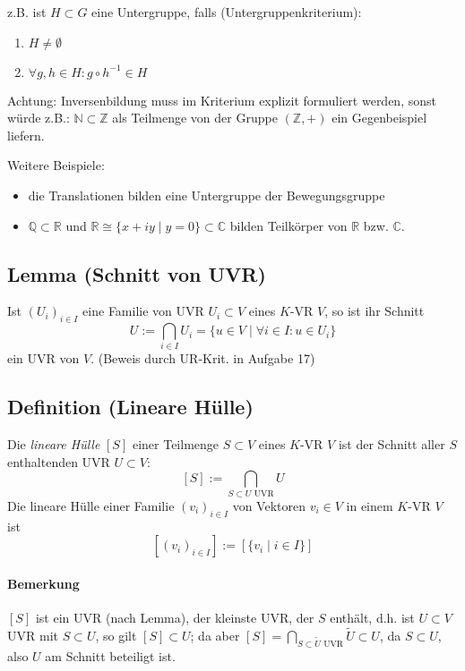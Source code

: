  		z.B. ist $H\subset G$ eine Untergruppe, falls (Untergruppenkriterium):
 		\begin{enumerate}
 			\item $H\neq \emptyset$
 			\item $\forall g,h\in H: g\circ h^{-1} \in H$
 		\end{enumerate}

 		Achtung: Inversenbildung muss im Kriterium explizit formuliert werden, sonst würde z.B.: $\mathbb{N}\subset\mathbb{Z}$ als Teilmenge von der Gruppe $(\mathbb{Z}, +)$ ein Gegenbeispiel liefern.

 		Weitere Beispiele:
 		\begin{itemize}
 			\item die Translationen bilden eine Untergruppe der Bewegungsgruppe
 			\item $\mathbb{Q}\subset\mathbb{R}$ und $\mathbb{R}\cong \{x+iy\mid y=0\}\subset\mathbb{C}$ bilden Teilkörper von $\mathbb{R}$ bzw. $\mathbb{C}$.
 		\end{itemize}

 \subsection{Lemma (Schnitt von UVR)}
 	\begin{Lemma}
 		Ist $(U_i)_{i\in I}$ eine Familie von UVR $U_i\subset V$ eines $K$-VR $V$, so ist ihr Schnitt
 		\[
 			U:= \bigcap_{i\in I}U_i =\{ u\in V\mid \forall i\in I: u\in U_i\}
 		\]
 		ein UVR von $V$. (Beweis durch UR-Krit. in Aufgabe 17)
 	\end{Lemma}

 \subsection{Definition (Lineare Hülle)}
 	\begin{Definition}
 		Die \emph{lineare Hülle} $[S]$ einer Teilmenge $S\subset V$ eines $ K $-VR $ V $ ist der Schnitt aller $S$ enthaltenden UVR $U\subset V$:
 		\[
 			[S] := \bigcap_{S\subset U \text{ UVR}} U
 		\]
 		Die lineare Hülle einer Familie $(v_i)_{i\in I}$ von Vektoren $v_i\in V$ in einem $ K $-VR $ V $ ist
 		\[
 			[(v_i)_{i\in I}] := [\{v_i\mid i\in I\}]
 		\]
 	\end{Definition}

 	\paragraph{Bemerkung}
 		$[S]$ ist ein UVR (nach Lemma), der \glqq kleinste\grqq{} UVR, der $S$ enthält, d.h. ist $U\subset V$ UVR mit $S\subset U$, so gilt $[S]\subset U$; da aber $[S] = \bigcap_{S\subset \tilde{U}  \text{ UVR}}\tilde{U}\subset U$,
 		da $S\subset U$, also $U$ am Schnitt beteiligt ist.

